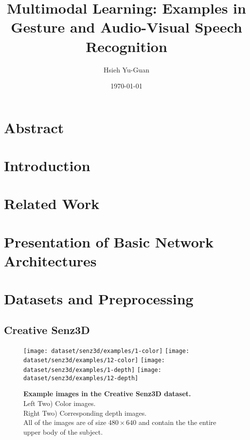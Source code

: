 

\title{Multimodal Learning: Examples in Gesture and Audio-Visual
Speech Recognition\vspace{-0.5em}}
\author{Hsieh Yu-Guan}
\date{\today}
\maketitle

\section*{Abstract}

\section{Introduction}

\section{Related Work}

\section{Presentation of Basic Network Architectures}

\section{Datasets and Preprocessing}

\subsection{Creative Senz3D}

\begin{figure}[H]
  \centering
  \hfill
  \texttt{[image: dataset/senz3d/examples/1-color]}
  \hfill
  \texttt{[image: dataset/senz3d/examples/12-color]}
  \hfill
  \texttt{[image: dataset/senz3d/examples/1-depth]}
  \hfill
  \texttt{[image: dataset/senz3d/examples/12-depth]}
  \caption{%
    \textbf{Example images in the Creative Senz3D dataset.}\\[0.1em]
    Left Two) Color images.\\[0.1em]
    Right Two) Corresponding depth images.\\[0.1em]
    All of the images are of size $480 \times 640$ and contain the
    the entire upper body of the subject.}
  \label{fig:senz3d_exs}
\end{figure}

